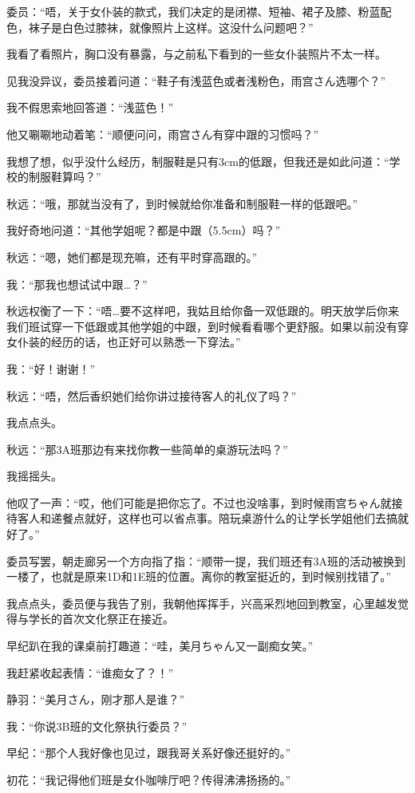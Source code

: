 委员：“唔，关于女仆装的款式，我们决定的是闭襟、短袖、裙子及膝、粉蓝配色，袜子是白色过膝袜，就像照片上这样。这没什么问题吧？”

我看了看照片，胸口没有暴露，与之前私下看到的一些女仆装照片不太一样。

见我没异议，委员接着问道：“鞋子有浅蓝色或者浅粉色，雨宫さん选哪个？”

我不假思索地回答道：“浅蓝色！”

他又唰唰地动着笔：“顺便问问，雨宫さん有穿中跟的习惯吗？”

我想了想，似乎没什么经历，制服鞋是只有3cm的低跟，但我还是如此问道：“学校的制服鞋算吗？”

秋远：“哦，那就当没有了，到时候就给你准备和制服鞋一样的低跟吧。”

我好奇地问道：“其他学姐呢？都是中跟（5.5cm）吗？”

秋远：“嗯，她们都是现充嘛，还有平时穿高跟的。”

我：“那我也想试试中跟…？”

秋远权衡了一下：“唔…要不这样吧，我姑且给你备一双低跟的。明天放学后你来我们班试穿一下低跟或其他学姐的中跟，到时候看看哪个更舒服。如果以前没有穿女仆装的经历的话，也正好可以熟悉一下穿法。”

我：“好！谢谢！”

秋远：“唔，然后香织她们给你讲过接待客人的礼仪了吗？”

我点点头。

秋远：“那3A班那边有来找你教一些简单的桌游玩法吗？”

我摇摇头。

他叹了一声：“哎，他们可能是把你忘了。不过也没啥事，到时候雨宫ちゃん就接待客人和递餐点就好，这样也可以省点事。陪玩桌游什么的让学长学姐他们去搞就好了。”

委员写罢，朝走廊另一个方向指了指：“顺带一提，我们班还有3A班的活动被换到一楼了，也就是原来1D和1E班的位置。离你的教室挺近的，到时候别找错了。”

我点点头，委员便与我告了别，我朝他挥挥手，兴高采烈地回到教室\laughcute，心里越发觉得与学长的首次文化祭正在接近。

早纪趴在我的课桌前打趣道：“哇，美月ちゃん又一副痴女笑。”

我赶紧收起表情：“谁痴女了？！”

静羽：“美月さん，刚才那人是谁？”

我：“你说3B班的文化祭执行委员？”

早纪：“那个人我好像也见过，跟我哥关系好像还挺好的。”

初花：“我记得他们班是女仆咖啡厅吧？传得沸沸扬扬的。”

